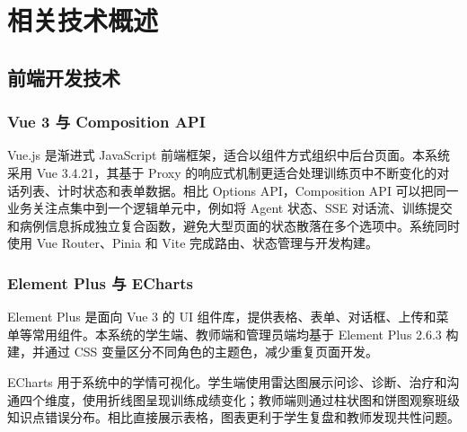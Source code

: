\chapter{相关技术概述}

\section{前端开发技术}

\subsection{Vue 3 与 Composition API}

Vue.js 是渐进式 JavaScript 前端框架，适合以组件方式组织中后台页面\cite{vuejs2024}。本系统采用 Vue 3.4.21，其基于 Proxy 的响应式机制更适合处理训练页中不断变化的对话列表、计时状态和表单数据。相比 Options API，Composition API 可以把同一业务关注点集中到一个逻辑单元中，例如将 Agent 状态、SSE 对话流、训练提交和病例信息拆成独立复合函数，避免大型页面的状态散落在多个选项中。系统同时使用 Vue Router、Pinia 和 Vite 完成路由、状态管理与开发构建。

\subsection{Element Plus 与 ECharts}

Element Plus 是面向 Vue 3 的 UI 组件库，提供表格、表单、对话框、上传和菜单等常用组件。本系统的学生端、教师端和管理员端均基于 Element Plus 2.6.3 构建，并通过 CSS 变量区分不同角色的主题色，减少重复页面开发。

ECharts 用于系统中的学情可视化\cite{echarts2024}。学生端使用雷达图展示问诊、诊断、治疗和沟通四个维度，使用折线图呈现训练成绩变化；教师端则通过柱状图和饼图观察班级知识点错误分布。相比直接展示表格，图表更利于学生复盘和教师发现共性问题。

